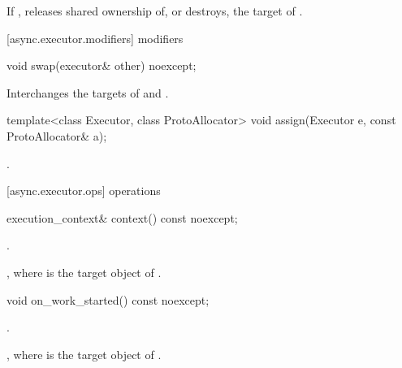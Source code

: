 \begin{itemdescr}
\pnum
\effects If , releases shared ownership of, or destroys, the target of .
\end{itemdescr}



[async.executor.modifiers]{ modifiers}

%
\begin{itemdecl}
void swap(executor& other) noexcept;
\end{itemdecl}

\begin{itemdescr}
\pnum
\effects Interchanges the targets of  and .
\end{itemdescr}

%
\begin{itemdecl}
template<class Executor, class ProtoAllocator>
  void assign(Executor e, const ProtoAllocator& a);
\end{itemdecl}

\begin{itemdescr}
\pnum
\effects {}.
\end{itemdescr}



[async.executor.ops]{ operations}

%
\begin{itemdecl}
execution_context& context() const noexcept;
\end{itemdecl}

\begin{itemdescr}
\pnum
\changed{\requires}{\expects} .

\pnum
\returns {}, where  is the target object of .
\end{itemdescr}

%
\begin{itemdecl}
void on_work_started() const noexcept;
\end{itemdecl}

\begin{itemdescr}
\pnum
\changed{\requires}{\expects} .

\pnum
\effects {}, where  is the target object of .
\end{itemdescr}

